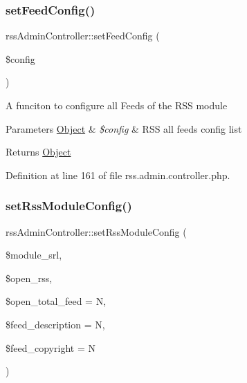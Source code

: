 \hypertarget{classrssAdminController_a57c67e2413e7d6491f090975531094cd}{}\label{classrssAdminController_a57c67e2413e7d6491f090975531094cd} 
\subsubsection{\texorpdfstring{set\+Feed\+Config()}{setFeedConfig()}}
{\footnotesize\ttfamily rss\+Admin\+Controller\+::set\+Feed\+Config (\begin{DoxyParamCaption}\item[{}]{\$config }\end{DoxyParamCaption})}

A funciton to configure all Feeds of the R\+SS module


\begin{DoxyParams}[1]{Parameters}
\hyperlink{classObject}{Object} & {\em \$config} & R\+SS all feeds config list \\
\hline
\end{DoxyParams}
\begin{DoxyReturn}{Returns}
\hyperlink{classObject}{Object} 
\end{DoxyReturn}


Definition at line 161 of file rss.\+admin.\+controller.\+php.

\hypertarget{classrssAdminController_ac4be2f74cc3b47f20d96b45c7ec5b619}{}\label{classrssAdminController_ac4be2f74cc3b47f20d96b45c7ec5b619} 
\subsubsection{\texorpdfstring{set\+Rss\+Module\+Config()}{setRssModuleConfig()}}
{\footnotesize\ttfamily rss\+Admin\+Controller\+::set\+Rss\+Module\+Config (\begin{DoxyParamCaption}\item[{}]{\$module\+\_\+srl,  }\item[{}]{\$open\+\_\+rss,  }\item[{}]{\$open\+\_\+total\+\_\+feed = {\ttfamily \textquotesingle{}N\textquotesingle{}},  }\item[{}]{\$feed\+\_\+description = {\ttfamily \textquotesingle{}N\textquotesingle{}},  }\item[{}]{\$feed\+\_\+copyright = {\ttfamily \textquotesingle{}N\textquotesingle{}} }\end{DoxyParamCaption})}

